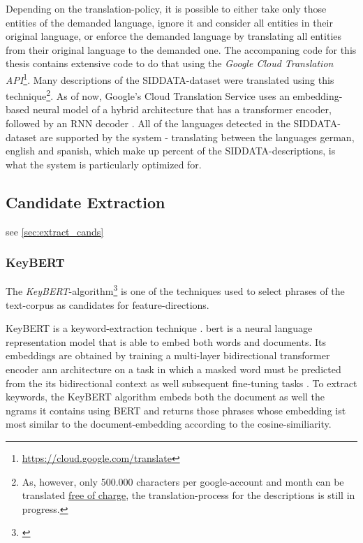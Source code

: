 Depending on the translation-policy, it is possible to either take only those entities of the demanded language, ignore it and consider all entities in their original language, or enforce the demanded language by translating all entities from their original language to the demanded one. The accompaning code for this thesis contains extensive code to do that using the \emph{Google Cloud Translation API}\footnote{\url{https://cloud.google.com/translate}}. Many descriptions of the SIDDATA-dataset were translated using this technique\footnote{As, however, only 500.000 characters per google-account and month can be translated \href{https://cloud.google.com/translate/pricing}{free of charge}, the translation-process for the descriptions is still in progress.}. As of now, Google's Cloud Translation Service uses an embedding-based neural model of a hybrid architecture that has a transformer encoder, followed by an RNN decoder \cite{Chen2018}. All of the languages detected in the SIDDATA-dataset are supported by the system - translating between the languages german, english and spanish, which make up  percent of the SIDDATA-descriptions, is what the system is particularly optimized for. 


\subsection*{Candidate Extraction}

see \autoref{sec:extract_cands}

\subsubsection*{KeyBERT}
\label{ap:details_keybert}

The \emph{KeyBERT}-algorithm\footnote{\label{fnote:keybertgibhut}} \cite{grootendorst2020keybert} is one of the techniques used to select phrases of the text-corpus as candidates for \gls{feature}-directions. 

KeyBERT is a keyword-extraction technique . \Gls{bert} is a neural language representation model that is able to embed both words and documents. Its embeddings are obtained by training a multi-layer bidirectional transformer encoder \gls{ann} architecture on a task in which a masked word must be predicted from the its bidirectional context as well subsequent fine-tuning tasks \cite{Devlin2019}. To extract keywords, the KeyBERT algorithm embeds both the document as well the \glspl{ngram} it contains using BERT and returns those phrases whose embedding ist most similar to the document-embedding according to the cosine-similiarity.

